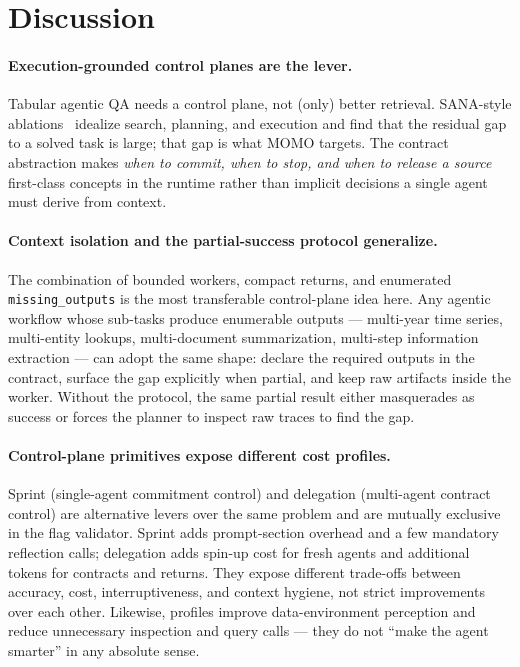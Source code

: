 \section{Discussion}
\label{sec:discussion}

\paragraph{Execution-grounded control planes are the lever.} Tabular agentic QA needs a control plane, not (only) better retrieval. SANA-style ablations~\cite{wang2026lakeqa} idealize search, planning, and execution and find that the residual gap to a solved task is large; that gap is what MOMO targets. The contract abstraction makes \emph{when to commit, when to stop, and when to release a source} first-class concepts in the runtime rather than implicit decisions a single agent must derive from context.

\paragraph{Context isolation and the partial-success protocol generalize.} The combination of bounded workers, compact returns, and enumerated \texttt{missing\_outputs} is the most transferable control-plane idea here. Any agentic workflow whose sub-tasks produce enumerable outputs --- multi-year time series, multi-entity lookups, multi-document summarization, multi-step information extraction --- can adopt the same shape: declare the required outputs in the contract, surface the gap explicitly when partial, and keep raw artifacts inside the worker. Without the protocol, the same partial result either masquerades as success or forces the planner to inspect raw traces to find the gap.

\paragraph{Control-plane primitives expose different cost profiles.} Sprint (single-agent commitment control) and delegation (multi-agent contract control) are alternative levers over the same problem and are mutually exclusive in the flag validator. Sprint adds prompt-section overhead and a few mandatory reflection calls; delegation adds spin-up cost for fresh agents and additional tokens for contracts and returns. They expose different trade-offs between accuracy, cost, interruptiveness, and context hygiene, not strict improvements over each other. Likewise, profiles improve data-environment perception and reduce unnecessary inspection and query calls --- they do not ``make the agent smarter'' in any absolute sense.

